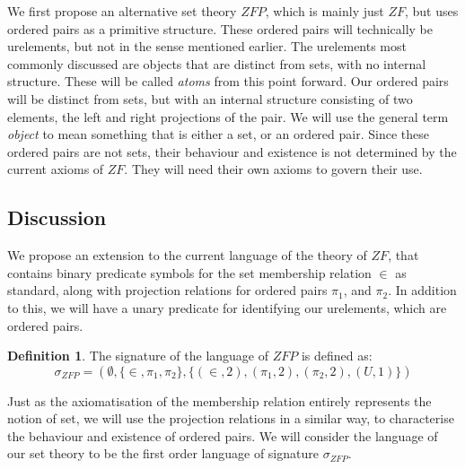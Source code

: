 \documentclass[11pt]{report}
\newcommand{\pleft}{\mathrel{\pi_1}}
\newcommand{\pright}{\mathrel{\pi_2}}
\theoremstyle{definition}
\theoremstyle{theorem}
\theoremstyle{lemma}
\newtheorem{definition}{Definition}[section]
\begin{document}
We first propose an alternative set theory $\mathit{ZFP}$, which is mainly just $\mathit{ZF}$, but uses ordered pairs as a primitive structure.
These ordered pairs will technically be urelements, but not in the sense mentioned earlier.
The urelements most commonly discussed are objects that are distinct from sets, with no internal structure.
These will be called \emph{atoms} from this point forward.
Our ordered pairs will be distinct from sets, but with an internal structure consisting of two elements, the left and right projections of the pair.
We will use the general term \emph{object} to mean something that is either a set, or an ordered pair.
Since these ordered pairs are not sets, their behaviour and existence is not determined by the current axioms of $\mathit{ZF}$.
They will need their own axioms to govern their use.

\subsection{Discussion}\label{zfpaxioms}
We propose an extension to the current language of the theory of $\mathit{ZF}$, that contains binary predicate symbols for the set membership relation $\in$ as standard, along with projection relations for ordered pairs $\pleft$, and $\pright$.
In addition to this, we will have a unary predicate for identifying our urelements, which are ordered pairs.
\begin{definition}
The signature of the language of $\mathit{ZFP}$ is defined as:
$$\sigma_\mathit{ZFP} = (\emptyset,\{\in, \pleft, \pright\},\{(\in,2),(\pleft,2),(\pright,2),(\mathit{U},1)\})$$
\end{definition}
\noindent
Just as the axiomatisation of the membership relation entirely represents the notion of set, we will use the projection relations in a similar way, to characterise the behaviour and existence of ordered pairs.
We will consider the language of our set theory to be the first order language of signature $\sigma_\mathit{ZFP}$.
\end{document}

